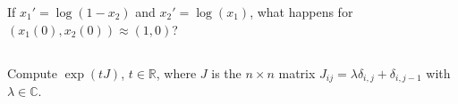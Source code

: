 \documentclass[12pt,a4paper]{article}
\newcommand{\IC}{\mathbb{C}}
\begin{document}
    If $x_1' = \log(1 - x_2)$ and $x_2' = \log(x_1)$,
    what happens
    for $(x_1(0), x_2(0)) \approx (1, 0)$?

    \setcounter{section}{1}
    \setcounter{subsection}{19}
    
    \subsection{}
    
    Compute $\exp(t J)$, $t \in \mathbb{R}$,
    where $J$ is the $n \times n$ matrix
    $J_{i j} = \lambda \delta_{i, j} + \delta_{i, j - 1}$
    with
    $\lambda \in \IC$.
\end{document}
